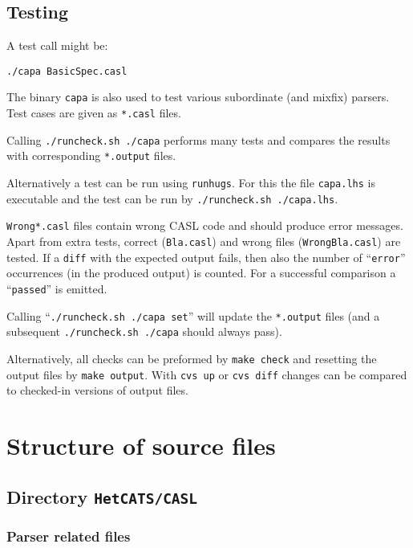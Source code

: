 \documentclass{article}
\begin{document}
\subsection{Testing}

A test call might be: 

\texttt{./capa BasicSpec.casl}

The binary \texttt{capa} is also used to test various subordinate (and
mixfix) parsers. Test cases are given as \texttt{*.casl} files.

Calling \texttt{./runcheck.sh ./capa} performs many tests and compares the
results with corresponding \texttt{*.output} files.

Alternatively a test can be run using \texttt{runhugs}. For this the
file \texttt{capa.lhs} is executable and the test can be run
by \texttt{./runcheck.sh ./capa.lhs}.

\texttt{Wrong*.casl} files contain wrong CASL code and should produce
error messages. Apart from extra tests, correct (\texttt{Bla.casl})
and wrong files (\texttt{WrongBla.casl}) are tested. If a \texttt{diff}
with the expected output fails, then also the number of
``\texttt{error}'' occurrences (in the produced output) is counted. For a
successful comparison a ``\texttt{passed}'' is emitted.

Calling ``\texttt{./runcheck.sh ./capa set}'' will update the
\texttt{*.output} files (and a subsequent \texttt{./runcheck.sh ./capa} should
always pass). 

Alternatively, all checks can be preformed by \texttt{make check} and
resetting the output files by \texttt{make output}. With \texttt{cvs up} or
\texttt{cvs diff} changes can be compared to checked-in versions of output
files.

\section{Structure of source files}

\subsection{Directory \texttt{HetCATS/CASL}}

\subsubsection*{Parser related files}
\end{document}
